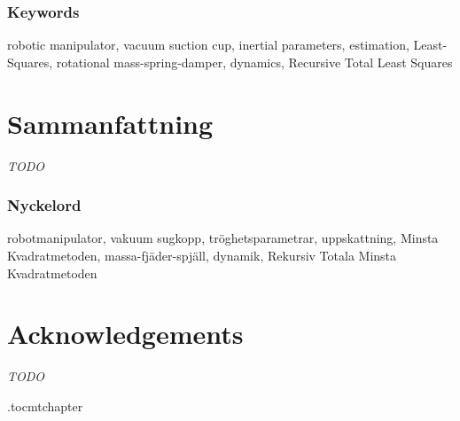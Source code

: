\documentclass[/home/francois/latex/report/main.tex]{subfiles}
\begin{document}
\subsection*{Keywords}

robotic manipulator, vacuum suction cup, inertial parameters, estimation, Least-Squares, rotational mass-spring-damper, dynamics, Recursive Total Least Squares

\newpage
\thispagestyle{plain}

\chapter*{Sammanfattning}

\textit{TODO}

\subsection*{Nyckelord}

robotmanipulator, vakuum sugkopp, tröghetsparametrar, uppskattning, Minsta Kvadratmetoden, massa-fjäder-spjäll, dynamik, Rekursiv Totala Minsta Kvadratmetoden

\newpage
\thispagestyle{plain}
\chapter*{Acknowledgements}

\textit{TODO}


\newpage



\newpage

\etocdepthtag.toc{mtchapter}
\thispagestyle{plain}
\tableofcontents

\newpage
\end{document}
